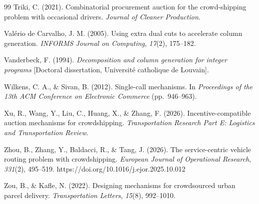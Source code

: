 \begin{singlespace}
\begin{thebibliography}{99}
Triki, C. (2021). Combinatorial procurement auction for the crowd-shipping
problem with occasional drivers. \emph{Journal of Cleaner Production}.

Val{\'e}rio de Carvalho, J. M. (2005). Using extra dual cuts to accelerate
column generation. \emph{INFORMS Journal on Computing}, \emph{17}(2),
175--182.

Vanderbeck, F. (1994). \emph{Decomposition and column generation for
integer programs} [Doctoral dissertation, Universit{\'e} catholique de
Louvain]. %

Wilkens, C. A., \& Sivan, B. (2012). Single-call mechanisms. In
\emph{Proceedings of the 13th ACM Conference on Electronic Commerce}
(pp.~946--963). %

Xu, R., Wang, Y., Liu, C., Huang, X., \& Zhang, F. (2026).
Incentive-compatible auction mechanisms for crowdshipping.
\emph{Transportation Research Part E: Logistics and Transportation Review}.

Zhou, B., Zhang, Y., Baldacci, R., \& Tang, J. (2026). The service-centric
vehicle routing problem with crowdshipping. \emph{European Journal of
Operational Research}, \emph{331}(2), 495--519.
https://doi.org/10.1016/j.ejor.2025.10.012

Zou, B., \& Kafle, N. (2022). Designing mechanisms for crowdsourced urban
parcel delivery. \emph{Transportation Letters}, \emph{15}(8), 992--1010.

\end{thebibliography}
\end{singlespace}
